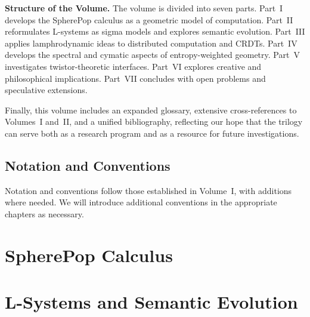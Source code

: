 \documentclass[11pt]{book}
\begin{document}
\bigskip
\noindent\textbf{Structure of the Volume.}
The volume is divided into seven parts. Part~I develops the SpherePop
calculus as a geometric model of computation. Part~II reformulates
L-systems as sigma models and explores semantic evolution. Part~III
applies lamphrodynamic ideas to distributed computation and CRDTs.
Part~IV develops the spectral and cymatic aspects of entropy-weighted
geometry. Part~V investigates twistor-theoretic interfaces. Part~VI
explores creative and philosophical implications. Part~VII concludes
with open problems and speculative extensions.


Finally, this volume includes an expanded glossary, extensive
cross-references to Volumes~I and~II, and a unified bibliography,
reflecting our hope that the trilogy can serve both as a research
program and as a resource for future investigations.

\chapter*{Notation and Conventions}

Notation and conventions follow those established in Volume~I, with
additions where needed. We will introduce additional conventions in the
appropriate chapters as necessary.

\mainmatter

\part{SpherePop Calculus}





\part{L-Systems and Semantic Evolution}




\end{document}
